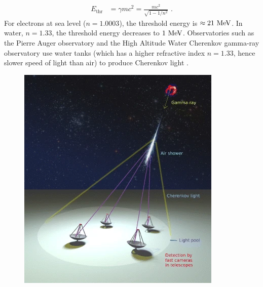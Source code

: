 \begin{equation}
    \begin{aligned}
    E_\text{thr}&=\gamma mc^2=\frac{mc^2}{\sqrt{1-{1}/{n^2}}}\text{ .}
    \end{aligned}
\end{equation}
\noindent For electrons at sea level ($n=1.0003$), the threshold energy is $\approx 21~\si{\mega\electronvolt}$. In water, $n=1.33$, the threshold energy decreases to $1~\si{\mega\electronvolt}$. Observatories such as the Pierre Auger observatory and the High Altitude Water Cherenkov gamma-ray observatory use water tanks (which has a higher refractive index $n=1.33$, hence slower speed of light than air) to produce Cherenkov light \citep{alma9924446790001811}.

\begin{figure}[h]
    \centering
    \includegraphics[height=0.4\textheight]{05_Astronomy/Images/air_shower/chenkov_light_pool.png}

\end{figure}
